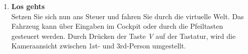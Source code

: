 \begin{enumerate}[label=\arabic*.]
\item \textbf{Los gehts}\\
Setzen Sie sich nun ans Steuer und fahren Sie durch die virtuelle Welt. Das Fahrzeug kann über Eingaben im Cockpit oder durch die Pfeiltasten gesteuert werden. Durch Drücken der Taste \textit{V} auf der Tastatur, wird die Kameraansicht zwischen 1st- und 3rd-Person umgestellt.


\end{enumerate}
